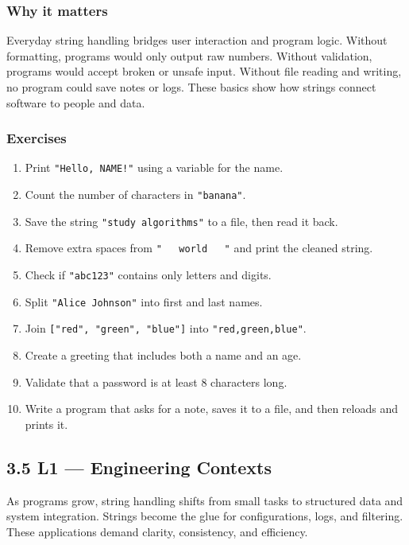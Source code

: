 \documentclass[
  letterpaper,
  DIV=11,
  numbers=noendperiod]{scrreprt}
\providecommand{\tightlist}{%
  \setlength{\itemsep}{0pt}\setlength{\parskip}{0pt}}
\begin{document}
\subsubsection{Why it matters}\label{why-it-matters-42}

Everyday string handling bridges user interaction and program logic.
Without formatting, programs would only output raw numbers. Without
validation, programs would accept broken or unsafe input. Without file
reading and writing, no program could save notes or logs. These basics
show how strings connect software to people and data.

\subsubsection{Exercises}\label{exercises-41}

\begin{enumerate}
\def\labelenumi{\arabic{enumi}.}
\tightlist
\item
  Print \texttt{"Hello,\ NAME!"} using a variable for the name.
\item
  Count the number of characters in \texttt{"banana"}.
\item
  Save the string \texttt{"study\ algorithms"} to a file, then read it
  back.
\item
  Remove extra spaces from \texttt{"\ \ \ world\ \ \ "} and print the
  cleaned string.
\item
  Check if \texttt{"abc123"} contains only letters and digits.
\item
  Split \texttt{"Alice\ Johnson"} into first and last names.
\item
  Join \texttt{{[}"red",\ "green",\ "blue"{]}} into
  \texttt{"red,green,blue"}.
\item
  Create a greeting that includes both a name and an age.
\item
  Validate that a password is at least 8 characters long.
\item
  Write a program that asks for a note, saves it to a file, and then
  reloads and prints it.
\end{enumerate}

\subsection{3.5 L1 --- Engineering
Contexts}\label{l1-engineering-contexts}

As programs grow, string handling shifts from small tasks to structured
data and system integration. Strings become the glue for configurations,
logs, and filtering. These applications demand clarity, consistency, and
efficiency.
\end{document}
